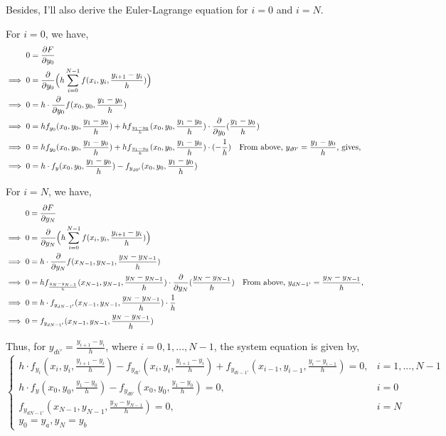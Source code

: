 \documentclass[12pt]{article}
\begin{document}
Besides, I'll also derive the Euler-Lagrange equation for $i = 0$ and $i = N$. 

For $i=0$, we have, 
\begin{align*}
	0 &= \frac{\partial F}{\partial y_0} \\
	\implies 0 &= \frac{\partial }{\partial y_0} \Bigl( h \sum_{i=0}^{N-1} f(x_i, y_i, \frac{y_{i+1} - y_i}{h}) \Bigr) \\
	\implies 0 &= h \cdot \frac{\partial}{\partial y_0} f(x_0, y_0, \frac{y_1 - y_0}{h})\\
    \implies 0 &= h f_{y_0}(x_0, y_0, \frac{y_1 - y_0}{h}) + h f_{\frac{y_1 - y_0}{h}}(x_0, y_0, \frac{y_1 - y_0}{h}) \cdot \frac{\partial}{\partial y_0} (\frac{y_1 - y_0}{h})\\
    \implies 0 &= h f_{y_0}(x_0, y_0, \frac{y_1 - y_0}{h}) + h f_{\frac{y_1 - y_0}{h}}(x_0, y_0, \frac{y_1 - y_0}{h}) \cdot (-\frac{1}{h}) \quad \text{From above, $y_{d0'} = \frac{y_1 - y_0}{h}$, gives, }\\
    \implies 0 &= h \cdot f_y(x_0, y_0, \frac{y_1 - y_0}{h}) - f_{y_{d0'}}(x_0, y_0, \frac{y_1 - y_0}{h})
\end{align*}

For $i=N$, we have, 
\begin{align*}
	0 &= \frac{\partial F}{\partial y_N} \\
	\implies 0 &= \frac{\partial }{\partial y_N} \Bigl( h \sum_{i=0}^{N-1} f(x_i, y_i, \frac{y_{i+1} - y_i}{h}) \Bigr) \\
	\implies 0 &= h \cdot \frac{\partial}{\partial y_N} f(x_{N-1}, y_{N-1}, \frac{y_N - y_{N-1}}{h})\\
	\implies 0 &= h f_{\frac{y_N - y_{N-1}}{h}}(x_{N-1}, y_{N-1}, \frac{y_N - y_{N-1}}{h}) \cdot \frac{\partial}{\partial y_N} (\frac{y_N - y_{N-1}}{h}) \quad \text{From above, $y_{dN-1'} = \frac{y_N - y_{N-1}}{h}$,}\\
	\implies 0 &= h \cdot f_{y_{dN-1'}}(x_{N-1}, y_{N-1}, \frac{y_N - y_{N-1}}{h}) \cdot \frac{1}{h} \\
	\implies 0 &= f_{y_{dN-1'}}(x_{N-1}, y_{N-1}, \frac{y_N - y_{N-1}}{h})
\end{align*}

Thus, for $y_{di'} = \frac{y_{i+1} - y_{i}}{h}$, where $i = 0, 1, ..., N-1$, the system equation is given by, 
$$
\begin{cases}
	h \cdot f_{y_i}(x_i, y_i, \frac{y_{i+1} - y_i}{h}) - f_{y_{di'}}(x_i, y_i, \frac{y_{i+1} - y_i}{h}) +  f_{y_{di-1'}}(x_{i-1}, y_{i-1}, \frac{y_i - y_{i-1}}{h}) = 0, & i = 1, ..., N-1\\
	h \cdot f_y(x_0, y_0, \frac{y_1 - y_0}{h}) - f_{y_{d0'}}(x_0, y_0, \frac{y_1 - y_0}{h})=0, & i=0\\
	f_{y_{dN-1'}}(x_{N-1}, y_{N-1}, \frac{y_N - y_{N-1}}{h}) = 0, & i=N \\
	y_0=y_a, y_N=y_b 
\end{cases}
$$
\end{document}
